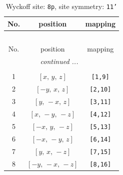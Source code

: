 \documentclass[fleqn,8pt]{jsarticle}
\begin{document}
\renewcommand{\arraystretch}{1.2}
\begin{longtable}{ccc}
\caption{Wyckoff site: {\tt 8p}, site symmetry: {\tt 11'}}
 \\
 \hline \hline
No. & position & mapping \\ \hline \endfirsthead

\multicolumn{2}{l}{\tablename\ \thetable{}} \\
 \hline \hline
No. & position & mapping \\ \hline \endhead

 \hline \hline
\multicolumn{2}{r}{\footnotesize\it continued ...} \\ \endfoot

 \hline \hline
\multicolumn{2}{r}{} \\ \endlastfoot

1 & $\left[ x,\, y,\, z \right]$ & {\tt [1,9]} \\ \hline
2 & $\left[ - y,\, x,\, z \right]$ & {\tt [2,10]} \\ \hline
3 & $\left[ y,\, - x,\, z \right]$ & {\tt [3,11]} \\ \hline
4 & $\left[ x,\, - y,\, - z \right]$ & {\tt [4,12]} \\ \hline
5 & $\left[ - x,\, y,\, - z \right]$ & {\tt [5,13]} \\ \hline
6 & $\left[ - x,\, - y,\, z \right]$ & {\tt [6,14]} \\ \hline
7 & $\left[ y,\, x,\, - z \right]$ & {\tt [7,15]} \\ \hline
8 & $\left[ - y,\, - x,\, - z \right]$ & {\tt [8,16]} \\
\end{longtable}
\end{document}
